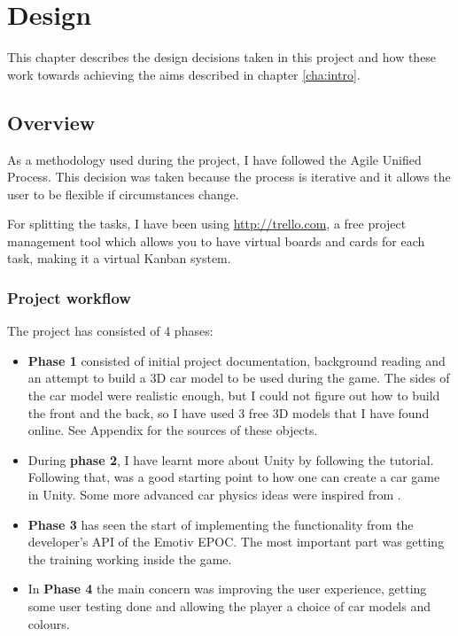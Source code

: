 \chapter{Design}
\label{cha:design}

This chapter describes the design decisions taken in this project and how these work towards achieving the aims described in chapter \ref{cha:intro}.

\section{Overview}
As a methodology used during the project, I have followed the Agile Unified Process. This decision was taken because the process is iterative and it allows the user to be flexible if circumstances change.

For splitting the tasks, I have been using \url{http://trello.com}, a free project management tool which allows you to have virtual boards and cards for each task, making it a virtual Kanban system.

\subsection{Project workflow}
The project has consisted of 4 phases:
\begin{itemize}
	\item \textbf{Phase 1} consisted of initial project documentation, background reading and an attempt to build a 3D car model to be used during the game. The sides of the car model were realistic enough, but I could not figure out how to build the front and the back, so I have used 3 free 3D models that I have found online. See Appendix for the sources of these objects.
	\item During \textbf{phase 2}, I have learnt more about Unity by following the \cite{walkerboys} tutorial. Following that, \cite{flattutorials} was a good starting point to how one can create a car game in Unity. Some more advanced car physics ideas were inspired from \cite{carphysics}.
	\item \textbf{Phase 3} has seen the start of implementing the functionality from the developer's API of the Emotiv EPOC. The most important part was getting the training working inside the game.
	\item In \textbf{Phase 4} the main concern was improving the user experience, getting some user testing done and allowing the player a choice of car models and colours.
\end{itemize}


